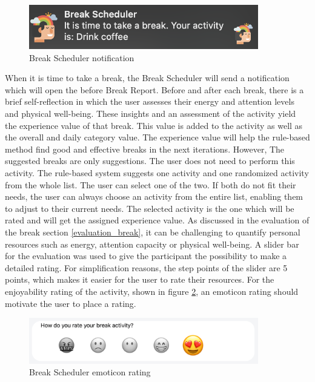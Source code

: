 \documentclass{hasel_thesis}
\begin{document}
\begin{figure}[htp]
    \centering
    \includegraphics[width=10cm]{hasel_thesis/images/notification.png}
    \caption{Break Scheduler notification}
    \label{fig:notification}
\end{figure}

When it is time to take a break, the Break Scheduler will send a notification which will open the before Break Report. Before and after each break, there is a brief self-reflection in which the user assesses their energy and attention levels and physical well-being. These insights and an assessment of the activity yield the experience value of that break. This value is added to the activity as well as the overall and daily category value. The experience value will help the rule-based method find good and effective breaks in the next iterations. However, The suggested breaks are only suggestions. The user does not need to perform this activity. The rule-based system suggests one activity and one randomized activity from the whole list. The user can select one of the two. If both do not fit their needs, the user can always choose an activity from the entire list, enabling them to adjust to their current needs. The selected activity is the one which will be rated and will get the assigned experience value. As discussed in the evaluation of the break section \ref{evaluation_break}, it can be challenging to quantify personal resources such as energy, attention capacity or physical well-being. A slider bar for the evaluation was used to give the participant the possibility to make a detailed rating. For simplification reasons, the step points of the slider are 5 points, which makes it easier for the user to rate their resources. For the enjoyability rating of the activity, shown in figure \ref{fig:rating}, an emoticon rating should motivate the user to place a rating.

\begin{figure}[htp]
    \centering
    \includegraphics[width=10cm]{hasel_thesis/images/rating.png}
    \caption{Break Scheduler emoticon rating}
    \label{fig:rating}
\end{figure}
\end{document}

